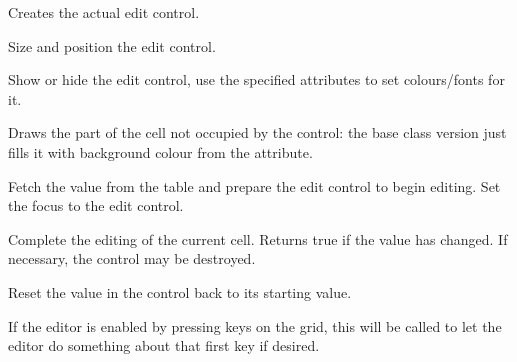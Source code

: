 Creates the actual edit control.

\label{wxgridcelleditorsetsize}


Size and position the edit control.

\label{wxgridcelleditorshow}


Show or hide the edit control, use the specified attributes to set
colours/fonts for it.

\label{wxgridcelleditorpaintbackground}


Draws the part of the cell not occupied by the control: the base class
version just fills it with background colour from the attribute.

\label{wxgridcelleditorbeginedit}


Fetch the value from the table and prepare the edit control
to begin editing. Set the focus to the edit control.

\label{wxgridcelleditorendedit}


Complete the editing of the current cell. Returns true if the value has
changed. If necessary, the control may be destroyed.

\label{wxgridcelleditorreset}


Reset the value in the control back to its starting value.

\label{wxgridcelleditorstartingkey}


If the editor is enabled by pressing keys on the grid,
this will be called to let the editor do something about
that first key if desired.

